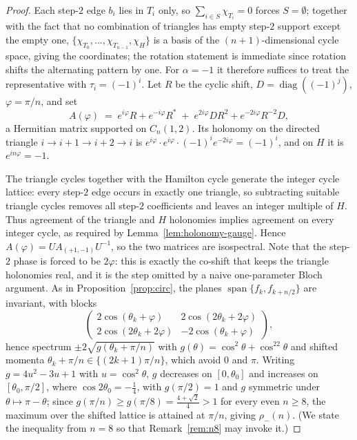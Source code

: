 \documentclass[11pt]{article}
\theoremstyle{remark}
\begin{document}
\begin{proof}
Each step-$2$ edge $b_i$ lies in $T_i$ only, so
$\sum_{i\in S}\chi_{T_i}=0$ forces $S=\emptyset$; together with the fact
that no combination of triangles has empty step-$2$ support except the
empty one, $\{\chi_{T_0},\dots,\chi_{T_{n-1}},\chi_H\}$ is a basis of
the $(n{+}1)$-dimensional cycle space, giving the coordinates; the
rotation statement is immediate since rotation shifts the alternating
pattern by one. For $\alpha=-1$ it therefore suffices to treat the
representative with $\tau_i=(-1)^i$. Let $R$ be the cyclic shift,
$D=\operatorname{diag}((-1)^j)$, $\varphi=\pi/n$, and set
\[
A(\varphi)\;=\;e^{i\varphi}R+e^{-i\varphi}R^{*}
\;+\;e^{2i\varphi}DR^{2}+e^{-2i\varphi}R^{-2}D ,
\]
a Hermitian matrix supported on $C_n(1,2)$. Its holonomy on the directed
triangle $i\to i{+}1\to i{+}2\to i$ is
$e^{i\varphi}\cdot e^{i\varphi}\cdot(-1)^ie^{-2i\varphi}=(-1)^i$, and on
$H$ it is $e^{in\varphi}=-1$.

The triangle cycles together with the Hamilton cycle generate the
integer cycle lattice: every step-$2$ edge occurs in exactly one triangle,
so subtracting suitable triangle cycles removes all step-$2$ coefficients
and leaves an integer multiple of $H$. Thus agreement of the triangle and
$H$ holonomies implies agreement on every integer cycle, as required by Lemma~\ref{lem:holonomy-gauge}. Hence $A(\varphi)=U A_{(+1,-1)}U^{-1}$, so the two matrices are
isospectral. Note that the step-$2$ phase is forced to be $2\varphi$: this is
exactly the co-shift that keeps the triangle holonomies real, and it is the step
omitted by a naive one-parameter Bloch argument. As in Proposition~\ref{prop:circ}, the
planes $\operatorname{span}\{f_k,f_{k+n/2}\}$ are invariant, with blocks
\[
\begin{pmatrix}
2\cos(\theta_k{+}\varphi)&2\cos(2\theta_k{+}2\varphi)\\
2\cos(2\theta_k{+}2\varphi)&-2\cos(\theta_k{+}\varphi)
\end{pmatrix},
\]
hence spectrum $\pm2\sqrt{g(\theta_k+\pi/n)}$ with
$g(\theta)=\cos^2\theta+\cos^22\theta$ and shifted momenta
$\theta_k+\pi/n\in\{(2k{+}1)\pi/n\}$, which avoid $0$ and $\pi$. Writing
$g=4u^2-3u+1$ with $u=\cos^2\theta$, $g$ decreases on $[0,\theta_0]$ and increases on
$[\theta_0,\pi/2]$, where $\cos2\theta_0=-\tfrac14$, with
$g(\pi/2)=1$ and $g$ symmetric under $\theta\mapsto\pi-\theta$;
since $g(\pi/n)\ge g(\pi/8)=\tfrac{4+\sqrt2}{4}>1$ for every even
$n\ge8$, the maximum over the shifted lattice is attained at $\pi/n$,
giving $\rho_-(n)$. (We state the inequality from $n=8$ so that
Remark~\ref{rem:n8} may invoke it.)
\end{proof}
\end{document}
